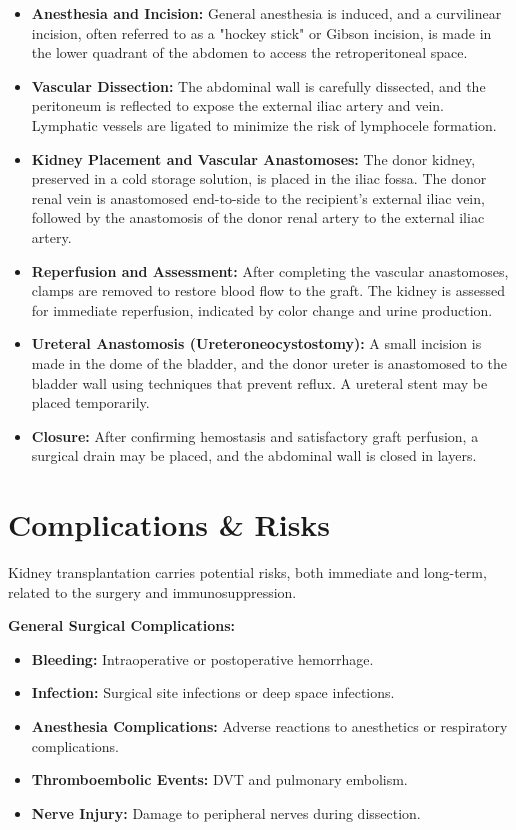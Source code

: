 \begin{itemize}
  \item \textbf{Anesthesia and Incision:} General anesthesia is induced, and a curvilinear incision, often referred to as a "hockey stick" or Gibson incision, is made in the lower quadrant of the abdomen to access the retroperitoneal space.
  
  \item \textbf{Vascular Dissection:} The abdominal wall is carefully dissected, and the peritoneum is reflected to expose the external iliac artery and vein. Lymphatic vessels are ligated to minimize the risk of lymphocele formation.
  
  \item \textbf{Kidney Placement and Vascular Anastomoses:} The donor kidney, preserved in a cold storage solution, is placed in the iliac fossa. The donor renal vein is anastomosed end-to-side to the recipient's external iliac vein, followed by the anastomosis of the donor renal artery to the external iliac artery.
  
  \item \textbf{Reperfusion and Assessment:} After completing the vascular anastomoses, clamps are removed to restore blood flow to the graft. The kidney is assessed for immediate reperfusion, indicated by color change and urine production.
  
  \item \textbf{Ureteral Anastomosis (Ureteroneocystostomy):} A small incision is made in the dome of the bladder, and the donor ureter is anastomosed to the bladder wall using techniques that prevent reflux. A ureteral stent may be placed temporarily.
  
  \item \textbf{Closure:} After confirming hemostasis and satisfactory graft perfusion, a surgical drain may be placed, and the abdominal wall is closed in layers.
\end{itemize}

\section*{Complications \& Risks}
Kidney transplantation carries potential risks, both immediate and long-term, related to the surgery and immunosuppression.

\textbf{General Surgical Complications:}
\begin{itemize}
  \item \textbf{Bleeding:} Intraoperative or postoperative hemorrhage.
  \item \textbf{Infection:} Surgical site infections or deep space infections.
  \item \textbf{Anesthesia Complications:} Adverse reactions to anesthetics or respiratory complications.
  \item \textbf{Thromboembolic Events:} DVT and pulmonary embolism.
  \item \textbf{Nerve Injury:} Damage to peripheral nerves during dissection.
\end{itemize}

